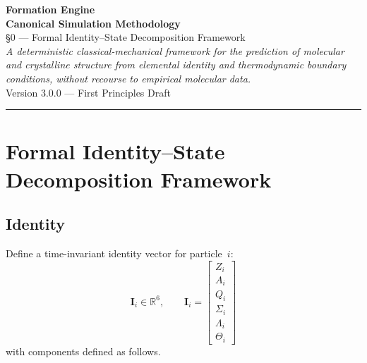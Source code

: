 \documentclass[11pt, a4paper, oneside]{article}
\theoremstyle{definition}
\theoremstyle{remark}
\newcommand{\R}{\mathbb{R}}
\newcommand{\boldI}{\mathbf{I}}
\begin{document}
\begin{center}
  {\LARGE\bfseries Formation Engine}\\[0.3em]
  {\LARGE\bfseries Canonical Simulation Methodology}\\[1.2em]
  {\large §0 — Formal Identity–State Decomposition Framework}\\[1.5em]
  {\normalsize
    \textit{A deterministic classical-mechanical framework for the prediction
    of molecular and crystalline structure from elemental identity and
    thermodynamic boundary conditions, without recourse to empirical
    molecular data.}}\\[1.5em]
  {\small Version 3.0.0 — First Principles Draft}
\end{center}

\vspace{1em}
\hrule
\vspace{2em}

\section{Formal Identity–State Decomposition Framework}

\subsection{Identity}
\label{sec:identity-vector}

Define a time-invariant identity vector for particle~$i$:
%
\begin{equation}
\boldI_i \in \R^{6}, \qquad
\boldI_i =
\begin{bmatrix}
  Z_i \\ A_i \\ Q_i \\ \Sigma_i \\ \Lambda_i \\ \Theta_i
\end{bmatrix}
\label{eq:identity-vector}
\end{equation}
%
with components defined as follows.

\end{document}
